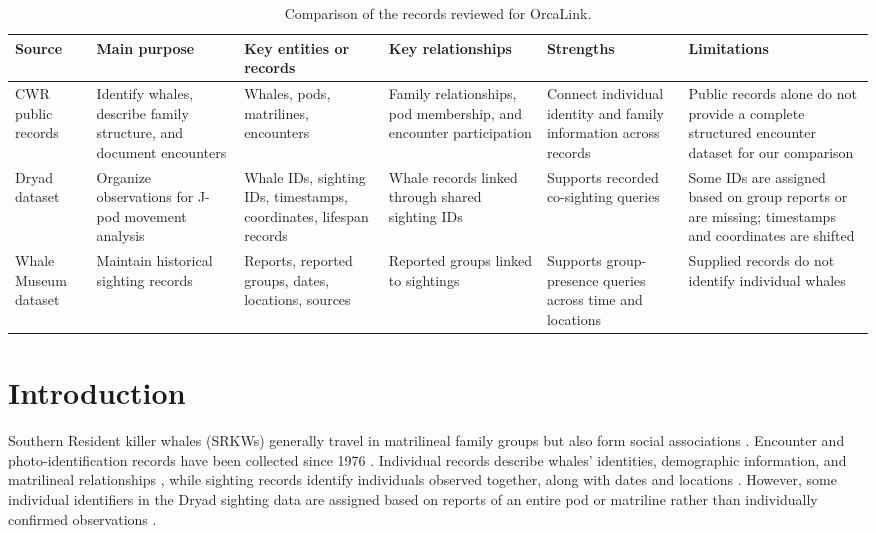 \documentclass[sigconf]{acmart}
\begin{document}
\begin{table}[!t]
\caption{Comparison of the records reviewed for OrcaLink.}
\label{tab:source-comparison}
\small
\setlength{\tabcolsep}{4pt}
\renewcommand{\arraystretch}{1.15}

\begin{tabularx}{\textwidth}{
  @{}>{\raggedright\arraybackslash}p{1.5cm}
  *{5}{>{\raggedright\arraybackslash}X}@{}
}

\toprule
\textbf{Source} &
\textbf{Main purpose} &
\textbf{Key entities or records} &
\textbf{Key relationships} &
\textbf{Strengths} &
\textbf{Limitations} \\
\midrule

CWR public records \cite{cwrOrcaID} &
Identify whales, describe family structure, and document encounters &
Whales, pods, matrilines, encounters &
Family relationships, pod membership, and encounter participation &
Connect individual identity and family information across records &
Public records alone do not provide a complete structured encounter dataset for our comparison \\
\midrule

Dryad dataset \cite{thompson2026dryad} &
Organize observations for J-pod movement analysis &
Whale IDs, sighting IDs, timestamps, coordinates, lifespan records &
Whale records linked through shared sighting IDs &
Supports recorded co-sighting queries &
Some IDs are assigned based on group reports or are missing; timestamps and coordinates are shifted \\
\midrule

Whale Museum dataset \cite{whalemuseum_dataset} &
Maintain historical sighting records &
Reports, reported groups, dates, locations, sources &
Reported groups linked to sightings &
Supports group-presence queries across time and locations &
Supplied records do not identify individual whales \\
\bottomrule
\end{tabularx}
\end{table}

\section{Introduction}

Southern Resident killer whales (SRKWs) generally travel in matrilineal family groups but also form social associations \cite{ellis2017}. Encounter and photo-identification records have been collected since 1976 \cite{cwrhistory}. Individual records describe whales' identities, demographic information, and matrilineal relationships \cite{orcaConservancy}, while sighting records identify individuals observed together, along with dates and locations \cite{thompson2026dryad}. However, some individual identifiers in the Dryad sighting data are assigned based on reports of an entire pod or matriline rather than individually confirmed observations \cite{thompson2026dryad}.
\end{document}
